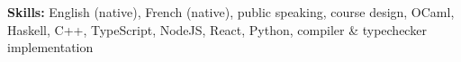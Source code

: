 \documentclass{article}
\begin{document}
% 
% 
% 

\textbf{Skills:} English (native), French (native), public speaking, course design, OCaml, Haskell,
C++, TypeScript, NodeJS, React, Python, compiler \& typechecker implementation
\end{document}
